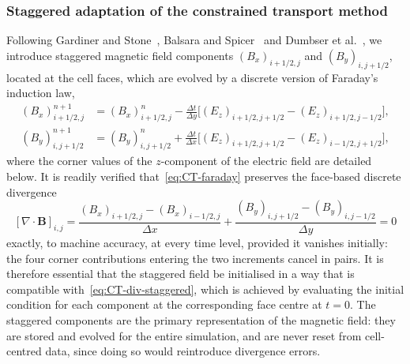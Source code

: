 \documentclass[a4paper,fleqn]{cas-sc}
\theoremstyle{definition}
\theoremstyle{remark}
\begin{document}
\subsubsection{Staggered adaptation of the constrained transport method}
\label{sec:CT-staggered}

Following Gardiner and Stone~\cite{GardinerStone2005}, Balsara and
Spicer~\cite{BalsaraSpicer1999} and Dumbser et al.~\cite{Dumbser2019}, we
introduce staggered magnetic field components $(B_x)_{i+1/2,j}$ and
$(B_y)_{i,j+1/2}$, located at the cell faces, which are evolved by a discrete
version of Faraday's induction law,
%
\begin{equation}
\label{eq:CT-faraday}
\begin{aligned}
(B_x)^{n+1}_{i+1/2,j}
  &= (B_x)^{n}_{i+1/2,j}
   - \frac{\Delta t}{\Delta y}\Big[(E_z)_{i+1/2,j+1/2}-(E_z)_{i+1/2,j-1/2}\Big],\\[2pt]
(B_y)^{n+1}_{i,j+1/2}
  &= (B_y)^{n}_{i,j+1/2}
   + \frac{\Delta t}{\Delta x}\Big[(E_z)_{i+1/2,j+1/2}-(E_z)_{i-1/2,j+1/2}\Big],
\end{aligned}
\end{equation}
%
where the corner values of the $z$-component of the electric field are detailed
below. It is readily verified that~\eqref{eq:CT-faraday} preserves the
face-based discrete divergence
%
\begin{equation}
\label{eq:CT-div-staggered}
[\nabla\cdot\mathbf B]_{i,j}
= \frac{(B_x)_{i+1/2,j}-(B_x)_{i-1/2,j}}{\Delta x}
+ \frac{(B_y)_{i,j+1/2}-(B_y)_{i,j-1/2}}{\Delta y} = 0
\end{equation}
%
exactly, to machine accuracy, at every time level, provided it vanishes
initially: the four corner contributions entering the two increments cancel in
pairs. It is therefore essential that the staggered field be initialised in a
way that is compatible with~\eqref{eq:CT-div-staggered}, which is achieved by
evaluating the initial condition for each component at the corresponding face
centre at $t=0$. The staggered components are the primary representation
of the magnetic field: they are stored and evolved for the entire simulation,
and are never reset from cell-centred data, since doing so would reintroduce
divergence errors.
\end{document}
